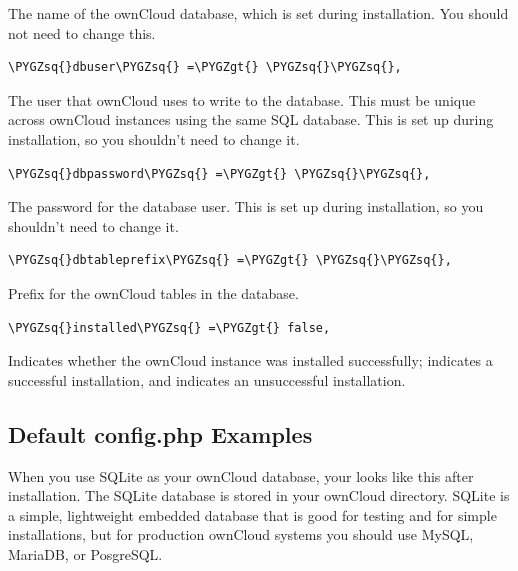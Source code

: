 \documentclass[letterpaper,10pt,english]{sphinxmanual}
\def\PYGZgt{\char`\>}
\def\PYGZsq{\char`\'}
\begin{document}
The name of the ownCloud database, which is set during installation. You
should not need to change this.

\begin{Verbatim}[commandchars=\\\{\}]
\PYGZsq{}dbuser\PYGZsq{} =\PYGZgt{} \PYGZsq{}\PYGZsq{},
\end{Verbatim}

The user that ownCloud uses to write to the database. This must be unique
across ownCloud instances using the same SQL database. This is set up during
installation, so you shouldn't need to change it.

\begin{Verbatim}[commandchars=\\\{\}]
\PYGZsq{}dbpassword\PYGZsq{} =\PYGZgt{} \PYGZsq{}\PYGZsq{},
\end{Verbatim}

The password for the database user. This is set up during installation, so
you shouldn't need to change it.

\begin{Verbatim}[commandchars=\\\{\}]
\PYGZsq{}dbtableprefix\PYGZsq{} =\PYGZgt{} \PYGZsq{}\PYGZsq{},
\end{Verbatim}

Prefix for the ownCloud tables in the database.

\begin{Verbatim}[commandchars=\\\{\}]
\PYGZsq{}installed\PYGZsq{} =\PYGZgt{} false,
\end{Verbatim}

Indicates whether the ownCloud instance was installed successfully; 
indicates a successful installation, and  indicates an unsuccessful
installation.


\subsection{Default config.php Examples}
\label{configuration_server/config_sample_php_parameters:default-config-php-examples}
When you use SQLite as your ownCloud database, your  looks like
this after installation. The SQLite database is stored in your ownCloud
 directory. SQLite is a simple, lightweight embedded database that
is good for testing and for simple installations, but for production ownCloud
systems you should use MySQL, MariaDB, or PosgreSQL.
\end{document}
